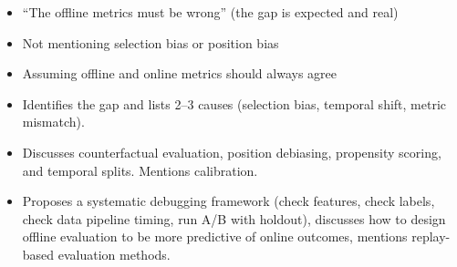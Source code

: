 \begin{interviewq}
\redflags
\begin{itemize}
    \item ``The offline metrics must be wrong'' (the gap is expected and real)
    \item Not mentioning selection bias or position bias
    \item Assuming offline and online metrics should always agree
\end{itemize}


\goodgreat
\begin{itemize}
    \item {} Identifies the gap and lists 2--3 causes (selection bias, temporal shift, metric mismatch).
    \item {} Discusses counterfactual evaluation, position debiasing, propensity scoring, and temporal splits. Mentions calibration.
    \item {} Proposes a systematic debugging framework (check features, check labels, check data pipeline timing, run A/B with holdout), discusses how to design offline evaluation to be more predictive of online outcomes, mentions replay-based evaluation methods.
\end{itemize}

\end{interviewq}



